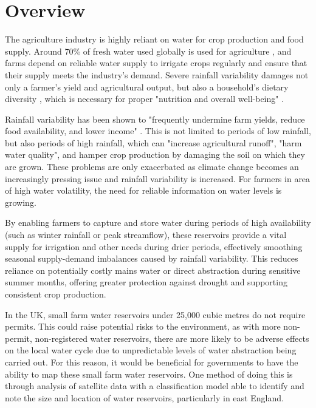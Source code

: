 

\section{Overview}
The agriculture industry is highly reliant on water for crop production and food supply. Around 70\% of fresh water used globally is used for agriculture \citep{emily_2023}, and farms depend on reliable water supply to irrigate crops regularly and ensure that their supply meets the industry's demand. Severe rainfall variability damages not only a farmer's yield and agricultural output, but also a household's dietary diversity \citep{object_object_2020}, which is necessary for proper "nutrition and overall well-being" \citep{food_diversity}.

Rainfall variability has been shown to "frequently undermine farm yields, reduce food availability, and lower income" \citep{guido_zimmer_lopus_hannah_gower_waldman_krell_sheffield_caylor_evans_2020}. This is not limited to periods of low rainfall, but also periods of high rainfall, which can "increase agricultural runoff", "harm water quality", and hamper crop production by damaging the soil on which they are grown. These problems are only exacerbated as climate change becomes an increasingly pressing issue \citep{united_states_environmental_protection_agency_2025} and rainfall variability is increased. For farmers in area of high water volatility, the need for reliable information on water levels is growing. 

By enabling farmers to capture and store water during periods of high availability (such as winter rainfall or peak streamflow), these reservoirs provide a vital supply for irrigation and other needs during drier periods, effectively smoothing seasonal supply-demand imbalances caused by rainfall variability. This reduces reliance on potentially costly mains water or direct abstraction during sensitive summer months, offering greater protection against drought and supporting consistent crop production.

In the UK, small farm water reservoirs under 25,000 cubic metres \citep{ukgov_2014_reservoirs} do not require permits. This could raise potential risks to the environment, as with more non-permit, non-registered water reservoirs, there are more likely to be adverse effects on the local water cycle due to unpredictable levels of water abstraction being carried out. For this reason, it would be beneficial for governments to have the ability to map these small farm water reservoirs. One method of doing this is through analysis of satellite data with a classification model able to identify and note the size and location of water reservoirs, particularly in east England. 

